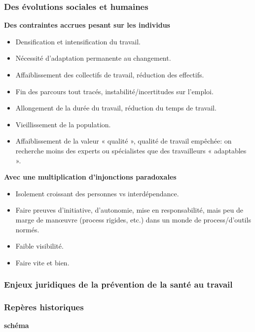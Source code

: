 \documentclass{beamer}
\begin{document}
\begin{frame}
\frametitle{Des évolutions sociales et humaines}
\textbf{Des contraintes accrues pesant sur les individus}
\begin{itemize}
\item Densification et intensification du travail.

\item Nécessité d’adaptation permanente au changement.

\item Affaiblissement des collectifs de travail, réduction des effectifs.

\item Fin des parcours tout tracés, instabilité/incertitudes sur l’emploi.

\item Allongement de la durée du travail, réduction du temps de travail.

\item Vieillissement de la population.

\item Affaiblissement de la valeur « qualité », qualité de travail empêchée: on recherche moins des experts 
ou spécialistes que des travailleurs « adaptables ».
\end{itemize}

\textbf{Avec une multiplication d’injonctions paradoxales}
\begin{itemize}
\item Isolement croissant des personnes vs interdépendance.

\item Faire preuves d’initiative, d’autonomie, mise en responsabilité, mais peu de marge de manœuvre (process 
rigides, etc.) dans un monde de process/d’outils normés.

\item Faible visibilité.

\item Faire vite et bien.
\end{itemize}
\end{frame}


\begin{frame}
\frametitle{Enjeux juridiques de la prévention de la santé au travail}

\end{frame} 


\begin{frame}
\frametitle{Repères historiques}

\textbf{schéma}

\end{frame} 
\end{document}

